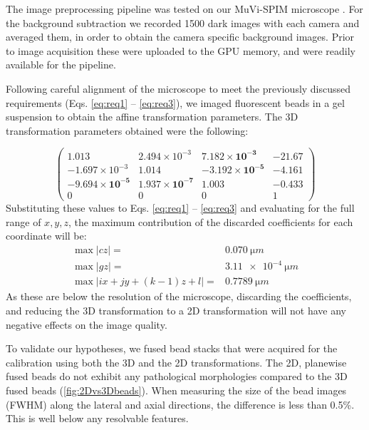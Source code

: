   The image preprocessing pipeline was tested on our MuVi-SPIM microscope \cite{krzic_multiview_2012}. For the background subtraction we recorded 1500 dark images with each camera and averaged them, in order to obtain the camera specific background images. Prior to image acquisition these were uploaded to the GPU memory, and were readily available for the pipeline.

  Following careful alignment of the microscope to meet the previously discussed requirements (Eqs. \ref{eq:req1} -- \ref{eq:req3}), we imaged fluorescent beads in a gel suspension to obtain the affine transformation parameters. The 3D transformation parameters obtained were the following:

  \[
  \begin{pmatrix}
    1.013 & 2.494\times 10^{-3} & \mathbf{7.182\times 10^{-3}} & -21.67 \\
    -1.697\times 10^{-3} & 1.014 & \mathbf{-3.192\times 10^{-5}} & -4.161 \\
    \mathbf{-9.694\times 10^{-5}} & \mathbf{1.937\times 10^{-7}} & \mathbf{1.003} & \mathbf{-0.433} \\
    0 & 0 & 0 & 1
  \end{pmatrix}
  \]
  Substituting these values to Eqs. \ref{eq:req1} -- \ref{eq:req3} and evaluating for the full range of $x, y, z$, the maximum contribution of the discarded coefficients for each coordinate will be:
  \begin{align*}
    \max |cz| =& \SI{0.070}{\micro m}  \\
    \max |gz| =& \SI{3.11e-4}{\micro m}  \\
    \max | i x + j y + (k-1)  z + l | =& \SI{0.7789}{\micro m}
  \end{align*}
  As these are below the resolution of the microscope, discarding the coefficients, and reducing the 3D transformation to a 2D transformation will not have any negative effects on the image quality.

  

  To validate our hypotheses, we fused bead stacks that were acquired for the calibration using both the 3D and the 2D transformations. The 2D, planewise fused beads do not exhibit any pathological morphologies compared to the 3D fused beads (\autoref{fig:2Dvs3Dbeads}). When measuring the size of the bead images (FWHM) along the lateral and axial directions, the difference is less than 0.5\%. This is well below any resolvable features.

